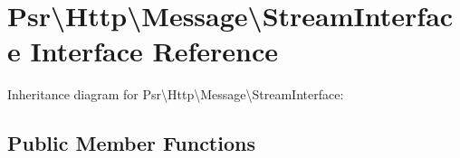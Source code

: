 \hypertarget{interfacePsr_1_1Http_1_1Message_1_1StreamInterface}{}\section{Psr\textbackslash{}Http\textbackslash{}Message\textbackslash{}Stream\+Interface Interface Reference}
\label{interfacePsr_1_1Http_1_1Message_1_1StreamInterface}


Inheritance diagram for Psr\textbackslash{}Http\textbackslash{}Message\textbackslash{}Stream\+Interface\+:
\subsection*{Public Member Functions}
